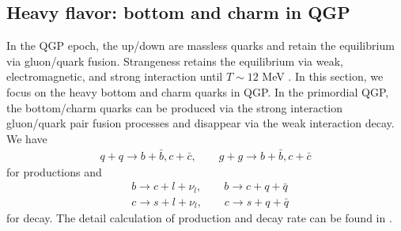 \documentclass[universe,article,submit,moreauthors,pdftex,a4paper]{Definitions/mdpi}
\begin{document}
\subsection{Heavy flavor: bottom and charm in QGP}\label{BottomCharm}
\noindent In the QGP epoch, the up/down are massless quarks and retain the equilibrium via gluon/quark fusion. Strangeness retains the equilibrium via weak, electromagnetic, and strong interaction until $T\sim12$ MeV \cite{Yang:2021bko}. In this section, we focus on the heavy bottom and charm quarks in QGP. In the primordial QGP, the bottom/charm quarks can be produced via the strong interaction gluon/quark pair fusion processes and disappear via the weak interaction decay. We have
\begin{align}
    q+q\longrightarrow b+\bar b, c+\bar c,\qquad g+g\longrightarrow b+\bar b, c+\bar c
\end{align}
for productions and 
\begin{align}
    &b\longrightarrow c+l+\nu_l, \qquad b\longrightarrow c+q+\bar{q}\\
&c\longrightarrow s+l+\nu_l,\qquad c\longrightarrow s+q+\bar{q}
\end{align}
for decay. The detail calculation of production and decay rate can be found in \cite{Yang:2020nne,Yang:2023bot}.
\end{document}
